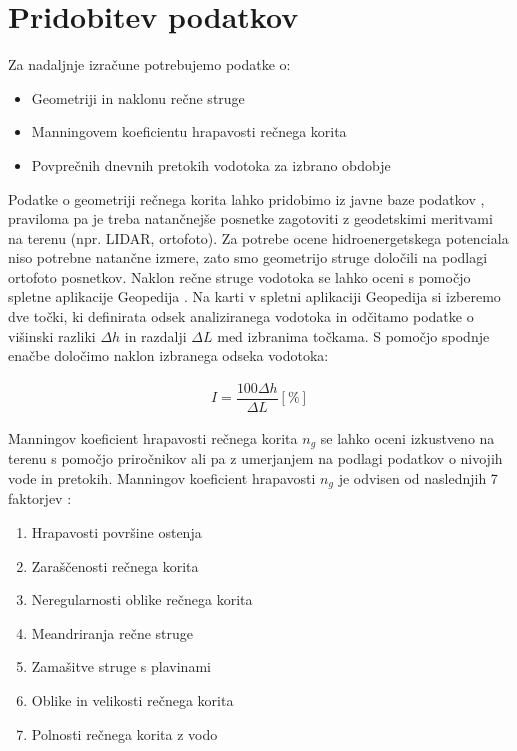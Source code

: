 \newpage
\section{Pridobitev podatkov} \label{sec:teorija_pridobitevPodatkov}
Za nadaljnje izračune potrebujemo podatke o:
\begin{itemize}[noitemsep, topsep=0pt]
	\item Geometriji in naklonu rečne struge
	\item Manningovem koeficientu hrapavosti rečnega korita
	\item Povprečnih dnevnih pretokih vodotoka za izbrano obdobje
\end{itemize}


Podatke o geometriji rečnega korita lahko pridobimo iz javne baze podatkov , praviloma pa je treba natančnejše posnetke zagotoviti z geodetskimi meritvami na terenu (npr. LIDAR, ortofoto). Za potrebe ocene hidroenergetskega potenciala niso potrebne natančne izmere, zato smo geometrijo struge določili na podlagi ortofoto posnetkov. Naklon rečne struge vodotoka se lahko oceni s pomočjo spletne aplikacije Geopedija \cite{Geopedija}. Na karti v spletni aplikaciji Geopedija si izberemo dve točki, ki definirata odsek analiziranega vodotoka in odčitamo podatke o višinski razliki $\Delta h$ in razdalji $\Delta L$ med izbranima točkama. S pomočjo spodnje enačbe določimo naklon izbranega odseka vodotoka:



\begin{ceqn}
\begin{align}
 I = \dfrac{100\Delta h}{\Delta L} [\%]
\end{align}
\end{ceqn}


  Manningov koeficient hrapavosti rečnega korita $n_g$ se lahko oceni izkustveno na terenu s pomočjo priročnikov ali pa z umerjanjem na podlagi podatkov o nivojih vode in pretokih. Manningov koeficient hrapavosti $n_g$ je odvisen od naslednjih 7 faktorjev \cite{VenTeChow}:
 \begin{enumerate}[noitemsep, topsep=0pt]
 	\item Hrapavosti površine ostenja
 	\item Zaraščenosti rečnega korita
 	\item Neregularnosti oblike rečnega korita
 	\item Meandriranja rečne struge
 	\item Zamašitve struge s plavinami 
 	\item Oblike in velikosti rečnega korita
 	\item Polnosti rečnega korita z vodo
 \end{enumerate}
 

